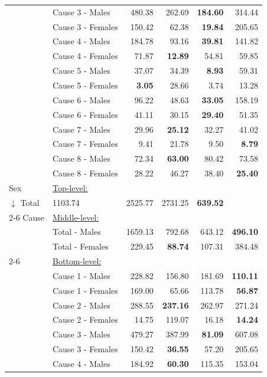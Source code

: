 \begin{center}
\begin{small}
\begin{longtable}{@{}llrrrr@{}}
& Cause 3 - Males & 480.38 & 262.69 & \textbf{184.60} & 314.44 \\
& Cause 3 - Females & 150.42 & 62.38 & \textbf{19.84} & 205.65 \\
& Cause 4 - Males & 184.78 & 93.16 & \textbf{39.81} & 141.82 \\
& Cause 4 - Females & 71.87 & \textbf{12.89} & 54.81 & 59.85 \\
& Cause 5 - Males & 37.07 & 34.39 & \textbf{8.93} & 59.31 \\
& Cause 5 - Females & \textbf{3.05} & 28.66 & 3.74 & 13.28 \\
& Cause 6 - Males & 96.22 & 48.63 & \textbf{33.05} & 158.19 \\
& Cause 6 - Females & 41.11 & 30.15 & \textbf{29.40} & 51.35 \\
& Cause 7 - Males & 29.96 & \textbf{25.12} & 32.27 & 41.02 \\
& Cause 7 - Females & 9.41 & 21.78 & 9.50 & \textbf{8.79} \\
& Cause 8 - Males & 72.34 & \textbf{63.00} & 80.42 & 73.58 \\
& Cause 8 - Females & 28.22 & 46.27 & 38.40 & \textbf{25.40} \\
\midrule
Sex & \multicolumn{5}{l}{\underline{Top-level:}}\\
$\downarrow$  Total & 1103.74 & 2525.77 & 2731.25 & \textbf{639.52} \\
\cmidrule{2-6}
Cause & \multicolumn{5}{l}{\underline{Middle-level:}}\\
& Total - Males & 1659.13 & 792.68 & 643.12 & \textbf{496.10} \\
& Total - Females & 229.45 & \textbf{88.74} & 107.31 & 384.48 \\
\cmidrule{2-6}
& \multicolumn{5}{l}{\underline{Bottom-level:}}\\
& Cause 1 - Males & 228.82 & 156.80 & 181.69 & \textbf{110.11} \\
& Cause 1 - Females & 169.00 & 65.66 & 113.78 & \textbf{56.87} \\
& Cause 2 - Males & 288.55 & \textbf{237.16} & 262.97 & 271.24 \\
& Cause 2 - Females & 14.75 & 119.07 & 16.18 & \textbf{14.24} \\
& Cause 3 - Males & 479.27 & 387.99 & \textbf{81.09} & 607.08 \\
& Cause 3 - Females & 150.42 & \textbf{36.55} & 57.20 & 205.65 \\
& Cause 4 - Males & 184.92 & \textbf{60.30} & 115.35 & 153.04 \\

\end{longtable}
\end{small}
\end{center}

